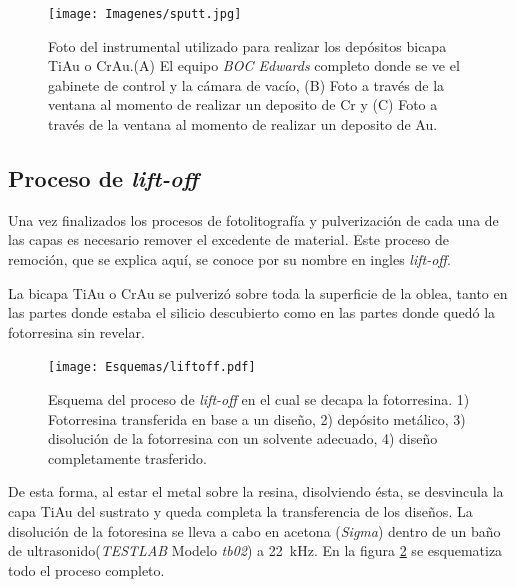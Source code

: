 		   		  \begin{figure}[t!]
				  \begin{center}
				  \texttt{[image: Imagenes/sputt.jpg]}
				  \caption[Equipo para depósito de películas delgadas, \textit{sputtering}]{Foto del instrumental utilizado para realizar los depósitos bicapa Ti\textbar Au o Cr\textbar Au.(A) El equipo \textit{BOC Edwards} completo donde se ve el gabinete de control y la cámara de vacío, (B) Foto a través de la ventana al momento de realizar un deposito de Cr y (C) Foto a través de la ventana al momento de realizar un deposito de Au.}
				  \label{fig:sputt}
				  \end{center}
				  \end{figure}

	\subsection{Proceso de\textit{ lift-off}}

   	     Una vez finalizados los procesos de fotolitografía y pulverización de cada una de las capas es necesario remover el excedente de material. Este proceso de remoción, que se explica aquí, se conoce por su nombre en ingles \textit{lift-off}.

		 La bicapa Ti\textbar Au o Cr\textbar Au se pulverizó sobre toda la superficie de la oblea, tanto en las partes donde estaba el silicio descubierto como en las partes donde quedó la fotorresina sin revelar. 
		
			\begin{figure}[h!]
			  \begin{center}
			  \texttt{[image: Esquemas/liftoff.pdf]}
			  \caption[Esquema del proceso de\textit{ lift-off}]{Esquema del proceso de\textit{ lift-off} en el cual se decapa la fotorresina. 1) Fotorresina transferida en base a un diseño, 2) depósito metálico, 3) disolución de la fotorresina con un solvente adecuado, 4) diseño completamente trasferido.}
			  \label{esq:liftoff}
			  \end{center}
			  \end{figure}

		 \pagebreak De esta forma, al estar el metal sobre la resina, disolviendo ésta, se desvincula la capa Ti\textbar Au del sustrato y queda completa la transferencia de los diseños. 
		 La disolución de la fotoresina se lleva a cabo en acetona (\textit{Sigma}) dentro de un baño de ultrasonido(\textit{TESTLAB} Modelo \textit{tb02}) a \SI{22}{\kHz}. En la figura \ref{esq:liftoff} se esquematiza todo el proceso completo.

